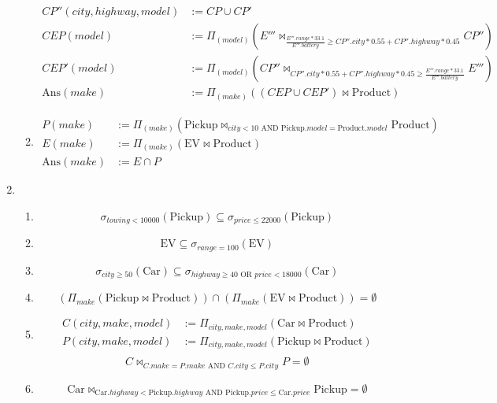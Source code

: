 \documentclass[12pt,letterpaper]{article}
\newcommand{\parens}[1]{\left(#1\right)}
\newcommand{\Ans}[0]{\text{Ans}}
\newcommand{\Car}[0]{\text{Car}}
\newcommand{\EV}[0]{\text{EV}}
\newcommand{\Pickup}[0]{\text{Pickup}}
\newcommand{\Product}[0]{\text{Product}}
\newcommand{\AND}[0]{\text{ AND }}
\newcommand{\OR}[0]{\text{ OR }}
\begin{document}
\begin{enumerate}
\begin{enumerate}
\begin{align*}
            CP''(city, highway, model) &:= CP \cup CP' \\
            CEP(model) &:= \Pi_{\parens{model}}\parens{E''' \bowtie_{\frac{E'''.range * 33.1}{E'''.battery} \ge CP''.city * 0.55 + CP''.highway * 0.45} CP''} \\
            CEP'(model) &:= \Pi_{\parens{model}}\parens{CP'' \bowtie_{CP''.city * 0.55 + CP''.highway * 0.45 \ge \frac{E'''.range * 33.1}{E'''.battery}} E'''} \\
            \Ans(make) &:= \Pi_{\parens{make}}\parens{\parens{CEP \cup CEP'} \bowtie \Product}
          \end{align*}
        \item
          \begin{align*}
            P(make) &:= \Pi_{\parens{make}}\parens{\Pickup \bowtie_{city < 10 \AND \Pickup.model = \Product.model} \Product} \\
            E(make) &:= \Pi_{\parens{make}}\parens{\EV \bowtie \Product} \\
            \Ans(make) &:= E \cap P
          \end{align*}
      \end{enumerate}

    \item
      \begin{enumerate}
        \item
          \[
            \sigma_{towing < 10000}\parens{\Pickup} \subseteq \sigma_{price \le 22000}\parens{\Pickup}
          \]
        \item
          \[
            \EV \subseteq \sigma_{range = 100}\parens{\EV}
          \]
        \item
          \[
            \sigma_{city \ge 50}\parens{\Car} \subseteq \sigma_{highway \ge 40 \OR price < 18000}\parens{\Car}
          \]
        \item
          \[
            \parens{\Pi_{make}\parens{\Pickup \bowtie \Product}} \cap \parens{\Pi_{make}\parens{\EV \bowtie \Product}} = \emptyset
          \]
        \item
          \begin{align*}
            C(city, make, model) &:= \Pi_{city, make, model}\parens{\Car \bowtie \Product} \\
            P(city, make, model) &:= \Pi_{city, make, model}\parens{\Pickup \bowtie \Product} \\
          \end{align*}
          \[
            C \bowtie_{C.make = P.make \AND C.city \le P.city} P = \emptyset
          \]
        \item
          \[
            \Car \bowtie_{\Car.highway < \Pickup.highway \AND \Pickup.price \le \Car.price} \Pickup = \emptyset
          \]
      \end{enumerate}


\end{enumerate}
\end{document}
